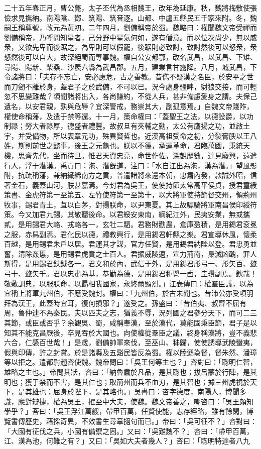 \begin{pinyinscope}
二十五年春正月，曹公薨，太子丕代為丞相魏王，改年為延康。秋，魏將梅敷使張儉求見撫納。南陽陰、酇、筑陽、筑音逐。山都、中盧五縣民五千家來附。冬，魏嗣王稱尊號，改元為黃初。二年四月，劉備稱帝於蜀。魏略曰：權聞魏文帝受禪而劉備稱帝，乃呼問知星者，己分野中星氣何如，遂有僭意。而以位次尚少，無以威衆，又欲先卑而後踞之，為卑則可以假寵，後踞則必致討，致討然後可以怒衆，衆怒然後可以自大，故深絕蜀而專事魏。權自公安都鄂，改名武昌，以武昌、下雉、尋陽、陽新、柴桑、沙羨六縣為武昌郡。五月，建業言甘露降。八月，城武昌，下令諸將曰：「夫存不忘亡，安必慮危，古之善教。昔儁不疑漢之名臣，於安平之世而刀劒不離於身，蓋君子之於武備，不可以已。況今處身疆畔，豺狼交接，而可輕忽不思變難哉？頃聞諸將出入，各尚謙約，不從人兵，甚非備慮愛身之謂。夫保己遺名，以安君親，孰與危辱？宜深警戒，務崇其大，副孤意焉。」自魏文帝踐阼，權使命稱藩，及遣于禁等還。十一月，策命權曰：「蓋聖王之法，以德設爵，以功制祿；勞大者祿厚，德盛者禮豐。故叔旦有夾輔之勳，太公有鷹揚之功，並啟土宇，并受備物，所以表章元功，殊異賢哲也。近漢高祖受命之初，分裂膏腴以王八姓，斯則前世之懿事，後王之元龜也。朕以不德，承運革命，君臨萬國，秉統天機，思齊先代，坐而待旦。惟君天資忠亮，命世作佐，深覩歷數，達見廢興，遠遣行人，浮于潛漢。禹貢曰：沲、潛旣道，注曰：「水自江出為沲，漢為潛。」望風影附，抗疏稱藩，兼納纖絺南方之貢，普遣諸將來還本朝，忠肅內發，款誠外昭，信著金石，義蓋山河，朕甚嘉焉。今封君為吳王，使使持節太常高平侯貞，授君璽綬策書、金虎符第一至第五、左竹使符第一至第十，以大將軍使持節督交州，領荊州牧事，錫君青土，苴以白茅，對揚朕命，以尹東夏。其上故驃騎將軍南昌侯印綬符策。今又加君九錫，其敬聽後命。以君綏安東南，綱紀江外，民夷安業，無或攜貳，是用錫君大輅、戎輅各一，玄牡二駟。君務財勸農，倉庫盈積，是用錫君衮冕之服，赤舄副焉。君化民以德，禮教興行，是用錫君軒縣之樂。君宣導休風，懷柔百越，是用錫君朱戶以居。君運其才謀，官方任賢，是用錫君納陛以登。君忠勇並奮，清除姦慝，是用錫君虎賁之士百人。君振威陵邁，宣力荊南，梟滅凶醜，罪人斯得，是用錫君鈇鉞各一。君文和於內，武信于外，是用錫君彤弓一、彤矢百、玈弓十、玈矢千。君以忠肅為基，恭勤為德，是用錫君秬鬯一卣，圭瓚副焉。欽哉！敬敷訓典，以服朕命，以勗相我國家，永終爾顯烈。」江表傳曰：權羣臣議，以為宜稱上將軍九州伯，不應受魏封。權曰：「九州伯，於古未聞也。昔沛公亦受項羽拜為漢王，此蓋時宜耳，復何損邪？」遂受之。孫盛曰：「昔伯夷、叔齊不屈有周，魯仲連不為秦民。夫以匹夫之志，猶義不辱，況列國之君參分天下，而可二三其節，或臣或否乎？余觀吳、蜀，咸稱奉漢，至於漢代，莫能固秉臣節，君子是以知其不能克昌厥後，卒見吞於大國也。向使權從羣臣之議，終身稱漢將，豈不義悲六合，仁感百世哉！」是歲，劉備帥軍來伐，至巫山、秭歸，使使誘導武陵蠻夷，假與印傳，許之封賞。於是諸縣及五谿民皆反為蜀。權以陸遜為督，督朱然、潘璋等以拒之。遣都尉趙咨使魏。魏帝問曰：「吳王何等主也？」咨對曰：「聦明仁智，雄略之主也。」帝問其狀，咨曰：「納魯肅於凡品，是其聦也；拔呂蒙於行陣，是其明也；獲于禁而不害，是其仁也；取荊州而兵不血刃，是其智也；據三州虎視於天下，是其雄也；屈身於陛下，是其略也。」吳書曰：咨字德度，南陽人，博聞多識，應對辯捷，權為吳王，擢至中大夫，使魏。魏文帝善之，嘲咨曰：「吳王頗知學乎？」荅曰：「吳王浮江萬艘，帶甲百萬，任賢使能，志存經略，雖有餘閑，博覽書傳歷史，藉採奇異，不效書生尋章擿句而已。」帝曰：「吳可征不？」咨對曰：「大國有征伐之兵，小國有備禦之固。」又曰：「吳難魏不？」咨曰：「帶甲百萬，江、漢為池，何難之有？」又曰：「吳如大夫者幾人？」咨曰：「聦明特達者八九
\end{pinyinscope}
